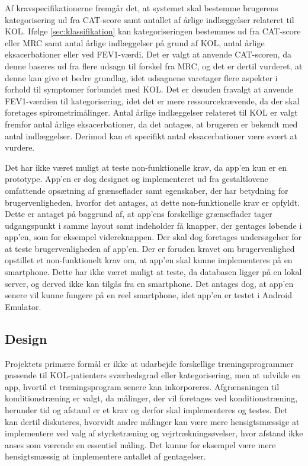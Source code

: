 Af kravspecifikationerne fremgår det, at systemet skal bestemme brugerens kategorisering ud fra CAT-score samt antallet af årlige indlæggelser relateret til KOL. Ifølge \autoref{sec:klassifikation} kan kategoriseringen bestemmes ud fra CAT-score eller MRC samt antal årlige indlæggelser på grund af KOL, antal årlige eksacerbationer eller ved FEV1-værdi. Det er valgt at anvende CAT-scoren, da denne baseres ud fra flere udsagn til forskel fra MRC, og det er dertil vurderet, at denne kan give et bedre grundlag, idet udsagnene varetager flere aspekter i forhold til symptomer forbundet med KOL. Det er desuden fravalgt at anvende FEV1-værdien til kategorisering, idet det er mere ressourcekrævende, da der skal foretages spirometrimålinger. Antal årlige indlæggelser relateret til KOL er valgt fremfor antal årlige eksacerbationer, da det antages, at brugeren er bekendt med antal indlæggelser. Derimod kan et specifikt antal eksacerbationer være svært at vurdere. 


Det har ikke været muligt at teste non-funktionelle krav, da app’en kun er en prototype. App’en er dog designet og implementeret ud fra gestaltlovene omfattende opsætning af grænseflader samt egenskaber, der har betydning for brugervenligheden, hvorfor det antages, at dette non-funktionelle krav er opfyldt. Dette er antaget på baggrund af, at app'ens forskellige grænseflader tager udgangspunkt i samme layout samt indeholder få knapper, der gentages løbende i app’en, som for eksempel videreknappen. Der skal dog foretages undersøgelser for at teste brugervenligheden af app'en. Der er foruden kravet om brugervenlighed opstillet et non-funktionelt krav om, at app'en skal kunne implementeres på en smartphone. Dette har ikke været muligt at teste, da databasen ligger på en lokal server, og derved ikke kan tilgås fra en smartphone. Det antages dog, at app'en senere vil kunne fungere på en reel smartphone, idet app'en er testet i Android Emulator.

\subsection{Design}
Projektets primære formål er ikke at udarbejde forskellige træningsprogrammer passende til KOL-patienters sværhedsgrad eller kategorisering, men at udvikle en app, hvortil et træningsprogram senere kan inkorporeres. Afgrænsningen til konditionstræning er valgt, da målinger, der vil foretages ved konditionstræning, herunder tid og afstand er et krav og derfor skal implementeres og testes. Det kan dertil diskuteres, hvorvidt andre målinger kan være mere hensigtsmæssige at implementere ved valg af styrketræning og vejrtrækningsøvelser, hvor afstand ikke anses som værende en essentiel måling. Det kunne for eksempel være mere hensigtsmæssig at implementere antallet af gentagelser. 

